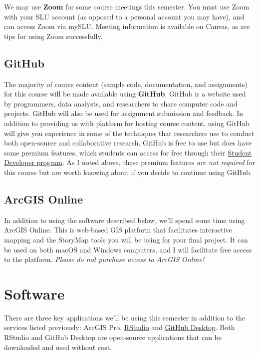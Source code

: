 \documentclass[
]{book}
\begin{document}
We may use \textbf{Zoom} for some course meetings this semester. You must use Zoom with your SLU account (as opposed to a personal account you may have), and can access Zoom via mySLU. Meeting information is available on Canvas, as are tips for using Zoom successfully.

\hypertarget{github}{%
\subsection{GitHub}\label{github}}

The majority of course content (sample code, documentation, and assignments) for this course will be made available using \textbf{GitHub}. GitHub is a website used by programmers, data analysts, and researchers to share computer code and projects. GitHub will also be used for assignment submission and feedback. In addition to providing us with platform for hosting course content, using GitHub will give you experience in some of the techniques that researchers use to conduct both open-source and collaborative research. GitHub is free to use but does have some premium features, which students can access for free through their \href{https://education.github.com/pack/}{Student Developer program}. As I noted above, these premium features \emph{are not required} for this course but are worth knowing about if you decide to continue using GitHub.

\hypertarget{arcgis-online}{%
\subsection{ArcGIS Online}\label{arcgis-online}}

In addition to using the software described below, we'll spend some time using ArcGIS Online. This is web-based GIS platform that facilitates interactive mapping and the StoryMap tools you will be using for your final project. It can be used on both macOS and Windows computers, and I will facilitate free access to the platform. \emph{Please do not purchase access to ArcGIS Online!}

\hypertarget{software}{%
\section{Software}\label{software}}

There are three key applications we'll be using this semester in addition to the services listed previously: ArcGIS Pro, \href{https://www.rstudio.com}{RStudio} and \href{https://desktop.github.com}{GitHub Desktop}. Both RStudio and GitHub Desktop are open-source applications that can be downloaded and used without cost.
\end{document}
